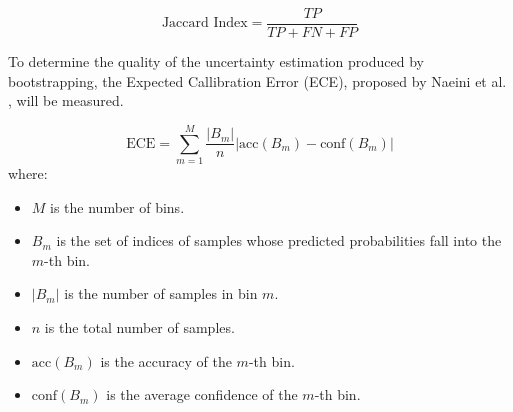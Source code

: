 \begin{equation}
    \label{eq:jaccard}
    \text{Jaccard Index} = \frac{TP}{TP + FN + FP}
\end{equation}


To determine the quality of the uncertainty estimation produced by bootstrapping, the Expected Callibration Error (ECE), proposed by Naeini et al. \cite{naeini2015obtaining}, will be measured. 

\begin{equation}
    \text{ECE} = \sum_{m=1}^M \frac{|B_m|}{n} \left| \text{acc}(B_m) - \text{conf}(B_m) \right|
\end{equation}
where:
\begin{itemize}
    \item \(M\) is the number of bins.
    \item \(B_m\) is the set of indices of samples whose predicted probabilities fall into the \(m\)-th bin.
    \item \(|B_m|\) is the number of samples in bin \(m\).
    \item \(n\) is the total number of samples.
    \item \(\text{acc}(B_m)\) is the accuracy of the \(m\)-th bin.
    \item \(\text{conf}(B_m)\) is the average confidence of the \(m\)-th bin.
\end{itemize}
